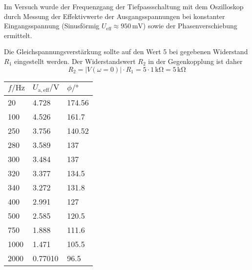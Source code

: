 Im Versuch wurde der Frequenzgang der Tiefpassschaltung mit dem Oszilloskop
durch Messung der Effektivwerte der Ausgangsspannungen bei konstanter
Eingangsspannung (Sinusförmig $U_{\mathrm{eff}} \approx 950 \,
\si{\milli\volt}$) sowie der Phasenverschiebung ermittelt.

Die Gleichspannungsverstärkung sollte auf den Wert 5 bei gegebenen Widerstand
$R_1$ eingestellt werden. Der Widerstandswert $R_2$ in der Gegenkopplung ist daher
\[R_2 = |V(\omega=0)| \cdot R_1 = 5 \cdot 1\, \si{\kilo\ohm} = 5 \, \si{\kilo\ohm}\]

\begin{table}[H]
  \begin{center}
\begin{tabular}{@{}lll@{}}
\toprule
$f / \si{\hertz}$ & $U_{\mathrm{a, eff}} / \si{\volt}$ & $\phi / \si{\degree}$ \\ \midrule
20                & 4.728                              & 174.56               \\
100               & 4.526                              & 161.7                \\
250               & 3.756                              & 140.52               \\
280               & 3.589                              & 137                  \\
\rowcolor{gray1} 
300               & 3.484                              & 137                  \\
\rowcolor{gray1} 
320               & 3.377                              & 134.5                \\
\rowcolor{gray1} 
340               & 3.272                              & 131.8                \\
400               & 2.991                              & 127                  \\
500               & 2.585                              & 120.5                \\
750               & 1.888                              & 111.6                \\
1000              & 1.471                              & 105.5                \\
2000              & 0.77010                             & 96.5                 \\

\end{tabular}
\end{center}
\end{table}
